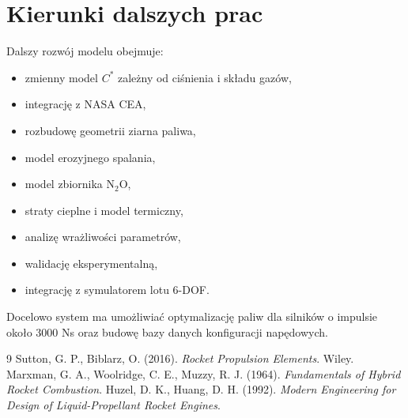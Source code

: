 \documentclass[a4paper,12pt]{article}
\begin{document}
\section{Kierunki dalszych prac}

Dalszy rozwój modelu obejmuje:

\begin{itemize}

\item zmienny model $C^*$ zależny od ciśnienia i składu gazów,
\item integrację z NASA CEA,
\item rozbudowę geometrii ziarna paliwa,
\item model erozyjnego spalania,
\item model zbiornika N$_2$O,
\item straty cieplne i model termiczny,
\item analizę wrażliwości parametrów,
\item walidację eksperymentalną,
\item integrację z symulatorem lotu 6-DOF.

\end{itemize}

Docelowo system ma umożliwiać optymalizację paliw dla silników o impulsie około 3000 Ns oraz budowę bazy danych konfiguracji napędowych.
\begin{thebibliography}{9}
Sutton, G. P., Biblarz, O. (2016). \textit{Rocket Propulsion Elements}. Wiley. 
Marxman, G. A., Woolridge, C. E., Muzzy, R. J. (1964). \textit{Fundamentals of Hybrid Rocket Combustion}. 
Huzel, D. K., Huang, D. H. (1992). \textit{Modern Engineering for Design of Liquid-Propellant Rocket Engines}.
\end{thebibliography}
\end{document}
